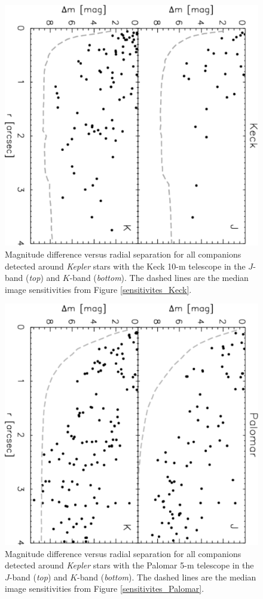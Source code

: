 \documentclass[twocolumn,appendixfloats]{aastex6}
\begin{document}
\begin{figure}[!]
\centering
\includegraphics[angle=90, scale=0.48]{Keck_AO_multiples.pdf}
\caption{Magnitude difference versus radial separation for all companions detected
around {\it Kepler} stars with the Keck 10-m telescope in the $J$-band ({\it top})
and $K$-band ({\it bottom}). The dashed lines are the median image sensitivities
from Figure \ref{sensitivites_Keck}.
\label{KOIs_Keck}}
\end{figure}

\begin{figure}[!]
\centering
\includegraphics[angle=90, scale=0.48]{Palomar_AO_multiples.pdf}
\caption{Magnitude difference versus radial separation for all companions detected
around {\it Kepler} stars with the Palomar 5-m telescope in the $J$-band ({\it top})
and $K$-band ({\it bottom}). The dashed lines are the median image sensitivities
from Figure \ref{sensitivites_Palomar}.
\label{KOIs_Palomar}}
\end{figure}
\end{document}
